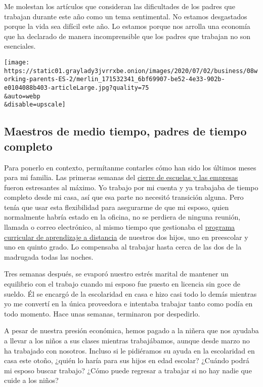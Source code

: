 Me molestan los artículos que consideran las dificultades de los padres
que trabajan durante este año como un tema sentimental. No estamos
desgastados porque la vida sea difícil este año. Lo estamos porque nos
arrolla una economía que ha declarado de manera incomprensible que los
padres que trabajan no son esenciales.

\texttt{[image: https://static01.graylady3jvrrxbe.onion/images/2020/07/02/business/08working-parents-ES-2/merlin\_171532341\_6bf69907-be52-4e33-902b-e0104088b403-articleLarge.jpg?quality=75\\\&auto=webp\\\&disable=upscale]}

\hypertarget{maestros-de-medio-tiempo-padres-de-tiempo-completo}{%
\subsection{Maestros de medio tiempo, padres de tiempo
completo}\label{maestros-de-medio-tiempo-padres-de-tiempo-completo}}

Para ponerlo en contexto, permítanme contarles cómo han sido los últimos
meses para mi familia. Las primeras semanas del
\href{https://www.nytimes3xbfgragh.onion/2020/05/01/nyregion/coronavirus-new-york-update.html}{cierre
de escuelas y las empresas} fueron estresantes al máximo. Yo trabajo por
mi cuenta y ya trabajaba de tiempo completo desde mi casa, así que esa
parte no necesitó transición alguna. Pero tenía que usar esta
flexibilidad para asegurarme de que mi esposo, quien normalmente habría
estado en la oficina, no se perdiera de ninguna reunión, llamada o
correo electrónico, al mismo tiempo que gestionaba el
\href{https://www.nytimes3xbfgragh.onion/2020/06/13/health/school-learning-online-education.html}{programa
curricular de aprendizaje a distancia} de nuestros dos hijos, uno en
preescolar y uno en quinto grado. Lo compensaba al trabajar hasta cerca
de las dos de la madrugada todas las noches.

Tres semanas después, se evaporó nuestro estrés marital de mantener un
equilibrio con el trabajo cuando mi esposo fue puesto en licencia sin
goce de sueldo. Él se encargó de la escolaridad en casa e hizo casi todo
lo demás mientras yo me convertí en la única proveedora e intentaba
trabajar tanto como podía en todo momento. Hace unas semanas, terminaron
por despedirlo.

A pesar de nuestra presión económica, hemos pagado a la niñera que nos
ayudaba a llevar a los niños a sus clases mientras trabajábamos, aunque
desde marzo no ha trabajado con nosotros. Incluso si le pidiéramos su
ayuda en la escolaridad en casa este otoño, ¿quién lo haría para sus
hijos en edad escolar? ¿Cuándo podrá mi esposo buscar trabajo? ¿Cómo
puede regresar a trabajar si no hay nadie que cuide a los niños?

